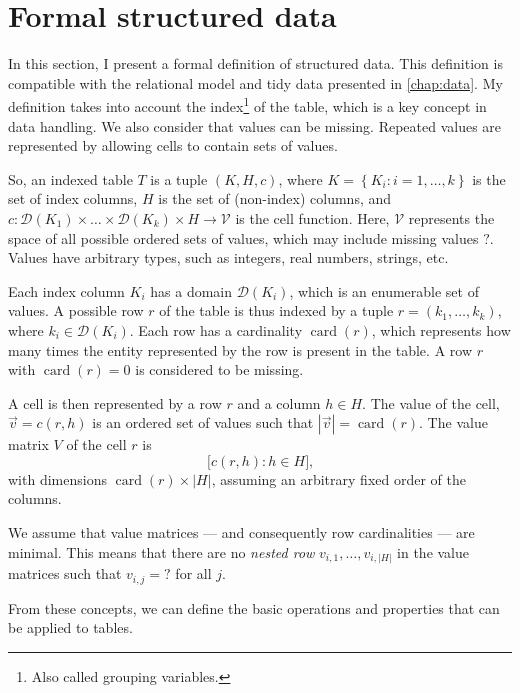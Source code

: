 {}
\clearpage

\section{Formal structured data}

\newcommand{\domainof}[1]{\mathcal{D}\!\left(#1\right)}
\newcommand{\missing}{\text{?}}
\newcommand{\rowcard}[1][k_1, \dots, k_k]{\operatorname{card}\!\left(#1\right)}

In this section, I present a formal definition of structured data.  This definition is
compatible with the relational model and tidy data presented in \cref{chap:data}.
My definition takes into account the index\footnote{Also called grouping variables.} of
the table, which is a key concept in data handling.  We also consider that values can be
missing.  Repeated values are represented by allowing cells to contain sets of values.

So, an indexed table $T$ is a tuple $(K, H, c)$, where $K = \left\{K_i : i = 1, \dots,
k\right\}$ is the set of index columns, $H$ is the set of (non-index) columns, and $c :
\domainof{K_1} \times \dots \times \domainof{K_k} \times H \to \mathcal{V}$ is the cell function.
Here, $\mathcal{V}$ represents the space of all possible ordered sets of values, which
may include missing values $\missing$.  Values have arbitrary types, such as integers,
real numbers, strings, etc.

Each index column $K_i$ has a domain $\domainof{K_i}$, which is an enumerable set of
values. A possible row $r$ of the table is thus indexed by a tuple $r = (k_1, \dots,
k_k)$, where $k_i \in \domainof{K_i}$.  Each row has a cardinality $\rowcard[r]$, which
represents how many times the entity represented by the row is present in the table.
A row $r$ with $\rowcard[r] = 0$ is considered to be missing.

A cell is then represented by a row $r$ and a column $h \in H$.  The value of the cell,
$\vec{v} = c(r, h)$ is an ordered set of values such that $|\vec{v}| = \rowcard[r]$.
The value matrix $V$ of the cell $r$ is \[
  \Big[ c(r, h) : h \in H \Big]\text{,}
\] with dimensions $\rowcard[r] \times |H|$, assuming an arbitrary fixed order of the
columns.

We assume that value matrices --- and consequently row cardinalities --- are minimal. This
means that there are no \emph{nested row} $v_{i, 1}, \dots, v_{i, |H|}$ in the value matrices
such that $v_{i, j} = \missing$ for all $j$.

From these concepts, we can define the basic operations and properties that can be applied
to tables.

